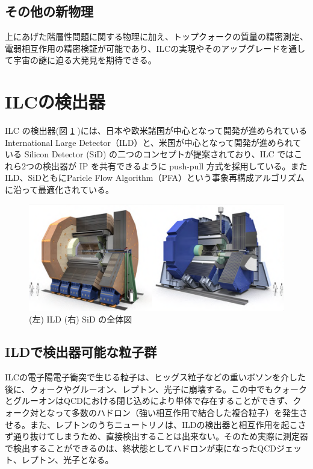 \subsection{その他の新物理}
上にあげた階層性問題に関する物理に加え、トップクォークの質量の精密測定、電弱相互作用の精密検証が可能であり、ILCの実現やそのアップグレードを通して宇宙の謎に迫る大発見を期待できる。
\section{ILCの検出器}
ILC の検出器(図 \ref{ilcdetector} )には、日本や欧米諸国が中心となって開発が進められている International Large Detector（ILD）と、米国が中心となって開発が進められている Silicon Detector (SiD) の二つのコンセプトが提案されており、ILC ではこれら2つの検出器が IP を共有できるように push-pull 方式を採用している。またILD、SiDともにParicle Flow Algorithm（PFA）という事象再構成アルゴリズムに沿って最適化されている。
\begin{figure}[h]
	\begin{center}
        \includegraphics[keepaspectratio, scale=0.4]
 	{Figure/Introduction/detector.png}
 		\caption[ILDとSiDの全体図]{(左) ILD (右) SiD の全体図\cite{tdr2}}
 		\label{ilcdetector}
	\end{center}
\end{figure}
\subsection{ILDで検出器可能な粒子群}
ILCの電子陽電子衝突で生じる粒子は、ヒッグス粒子などの重いボソンを介した後に、クォークやグルーオン、レプトン、光子に崩壊する。この中でもクォークとグルーオンはQCDにおける閉じ込めにより単体で存在することができず、クォーク対となって多数のハドロン（強い相互作用で結合した複合粒子）を発生させる。また、レプトンのうちニュートリノは、ILDの検出器と相互作用を起こさず通り抜けてしまうため、直接検出することは出来ない。そのため実際に測定器で検出することができるのは、終状態としてハドロンが束になったQCDジェット、レプトン、光子となる。
